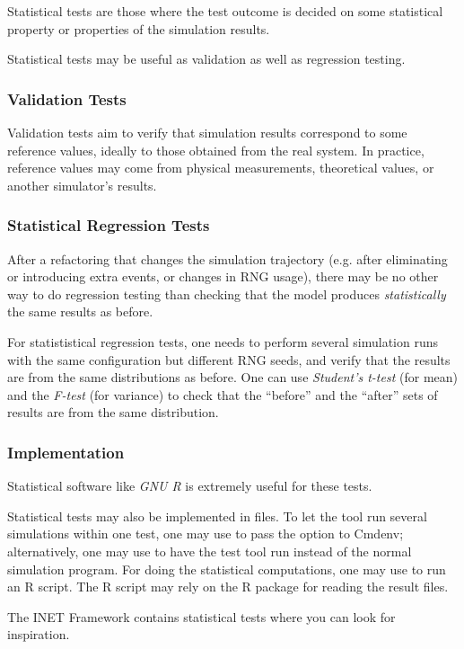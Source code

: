 Statistical tests are those where the test outcome is decided on
some statistical property or properties of the simulation results.

Statistical tests may be useful as validation as well as regression testing.

\subsubsection{Validation Tests}
\label{sec:testing:validation-tests}

Validation tests aim to verify that simulation results correspond to some
reference values, ideally to those obtained from the real system. In
practice, reference values may come from physical measurements, theoretical
values, or another simulator's results.

\subsubsection{Statistical Regression Tests}
\label{sec:testing:statistical-regression-tests}

After a refactoring that changes the simulation trajectory (e.g. after
eliminating or introducing extra events, or changes in RNG usage), there
may be no other way to do regression testing than checking that the model
produces \textit{statistically} the same results as before.

For statististical regression tests, one needs to perform several
simulation runs with the same configuration but different RNG seeds, and
verify that the results are from the same distributions as before. One can
use \textit{Student's t-test} (for mean) and the \textit{F-test} (for
variance) to check that the ``before'' and the ``after'' sets of results
are from the same distribution.

\subsubsection{Implementation}
\label{sec:testing:statistical-tests-implementation}

Statistical software like \textit{GNU R} is extremely useful for these
tests.

Statistical tests may also be implemented in  files. To let the
tool run several simulations within one test, one may use
 to pass the  option to Cmdenv;
alternatively, one may use  to have the test tool run
 instead of the normal simulation program. For doing the
statistical computations, one may use  to run an R
script. The R script may rely on the  R package for reading
the result files.

The INET Framework contains statistical tests where you can look for
inspiration.






